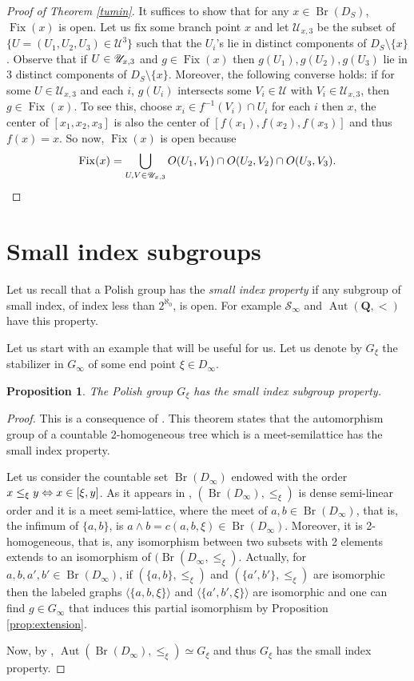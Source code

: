 \documentclass[JEP,XML,SOM,Unicode,NoFloatCountersInSection]{cedram}
\newcommand\ssi{\mathchoice{\iff}{\Leftrightarrow}{\Leftrightarrow}{\Leftrightarrow}}
\let\mathcal\mathscr
\theoremstyle{plain}
\newtheorem{prop}[thm]{Proposition}
\theoremstyle{definition}
\newcommand{\QQ}{\mathbf{Q}}
\newcommand{\cS}{\mathcal{S}}
\newcommand{\cU}{\mathcal{U}}
\newcommand{\sinf}{\cS_\infty}
\DeclareMathOperator{\Aut}{Aut}
\DeclareMathOperator{\Br}{Br}
\DeclareMathOperator{\Fix}{Fix}
\begin{document}
\begin{proof}[Proof of Theorem \ref{tumin}] It suffices to show that for any $x\in\Br(D_S)$, $\Fix(x)$ is open. Let us fix some branch point $x$ and let $\cU_{x,3}$ be the subset of \hbox{$\{U=(U_1,U_2,U_3)\in\cU^3\}$} such that the $U_i$'s lie in distinct components of $D_S\setminus\{x\}$. Observe that if $U\in\nobreak\cU_{x,3}$ and $g\in\Fix(x)$ then $g(U_1),g(U_2), g(U_3)$ lie in 3 distinct components of $D_S\setminus\{x\}$. Moreover, the following converse holds: if for some $U\in\cU_{x,3}$ and each $i$, $g(U_i)$ intersects some $V_i\in\cU$ with $V_i\in\cU_{x,3}$, then $g\in\Fix(x)$. To see this, choose $x_i\in f^{-1}(V_i)\cap U_i$ for each $i$ then $x$, the center of $[x_1,x_2,x_3]$ is also the center of $[f(x_1),f(x_2),f(x_3)]$ and thus $f(x)=x$.
So now, $\Fix(x)$ is open because
\[
\Fix(x)=\bigcup_{U,V\in\cU_{x,3}}O(U_1,V_1)\cap O(U_2,V_2)\cap O(U_3,V_3).\qedhere
\]
\end{proof}

\section{Small index subgroups}
Let us recall that a Polish group has the \emph{small index property} if any subgroup of small index, \ie of index less than $2^{\aleph_0}$, is open. For example $\sinf$ and $\Aut(\QQ,<)$ have this property.

Let us start with an example that will be useful for us. Let us denote by $G_\xi$ the stabilizer in $G_\infty$ of some end point $\xi\in D_\infty$.

\begin{prop}\label{sip} The Polish group $G_\xi$ has the small index subgroup property.
\end{prop}

\begin{proof} This is a consequence of \cite[Th.\,4.1]{MR988099}. This theorem states that the automorphism group of a countable 2-homogeneous tree which is a meet-semilattice has the small index property.

Let us consider the countable set $\Br(D_\infty)$ endowed with the order $x\leq_\xi y\ssi x\in[\xi,y]$. As it appears in \cite[Exam.\,5.2]{DM_dendritesII}, $(\Br(D_\infty),\leq_\xi)$ is dense semi-linear order and it is a meet semi-lattice, where the meet of $a,b\in\Br(D_\infty)$, that is, the infimum of $\{a,b\}$, is $a\wedge b=c(a,b,\xi)\in\Br(D_\infty)$. Moreover, it is 2-homogeneous, that is, any isomorphism between two subsets with 2 elements extends to an isomorphism of $(\Br(D_\infty,\leq_\xi)$. Actually, for $a,b,a',b'\in \Br(D_\infty)$, if $(\{a,b\},\leq_\xi)$ and $(\{a',b'\},\leq_\xi)$ are isomorphic then the labeled graphs $\langle \{a,b,\xi\}\rangle$ and $\langle \{a',b',\xi\}\rangle$ are isomorphic and one can find $g\in G_\infty$ that induces this partial isomorphism by Proposition \ref{prop:extension}.

Now, by \cite[Cor.\,5.21]{DM_dendritesII}, $\Aut(\Br(D_\infty),\leq_\xi)\simeq G_\xi$ and thus $G_\xi$ has the small index property.
\end{proof}
\end{document}
